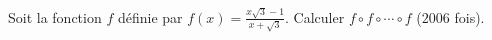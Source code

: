 Soit la fonction $f$ définie par $f(x) = \frac{x\sqrt{3} - 1}{x + \sqrt{3}}$. Calculer $f \circ f \circ \cdots \circ f$ ($2006$ fois).
